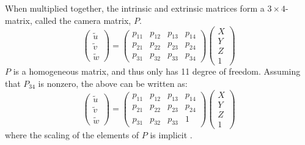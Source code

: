 When multiplied together, the intrinsic and extrinsic matrices form a $3\times4$-matrix, called the camera matrix, $P$.
\begin{equation} \label{eq:projection2}
\begin{pmatrix} \tilde{u} \\ \tilde{v} \\ \tilde{w} \end{pmatrix} =
\begin{pmatrix} p_{11} & p_{12} & p_{13} & p_{14} \\
 				p_{21} & p_{22} & p_{23} & p_{24} \\
				p_{31} & p_{32} & p_{33} & p_{34} \end{pmatrix}
\begin{pmatrix}X \\Y \\Z \\1\end{pmatrix}
\end{equation}
$P$ is a homogeneous matrix, and thus only has 11 degree of freedom.
Assuming that $P_{34}$ is nonzero, the above can be written as:
\begin{equation}\label{eq:projection3}
\begin{pmatrix} \tilde{u} \\ \tilde{v} \\ \tilde{w} \end{pmatrix} =
\begin{pmatrix} p_{11} & p_{12} & p_{13} & p_{14} \\
 				p_{21} & p_{22} & p_{23} & p_{24} \\
				p_{31} & p_{32} & p_{33} & 1 \end{pmatrix}
\begin{pmatrix}X \\Y \\Z \\1\end{pmatrix}
\end{equation}
where the scaling of the elements of $P$ is implicit \cite[p. 153-165]{hartley-zisserman}.

